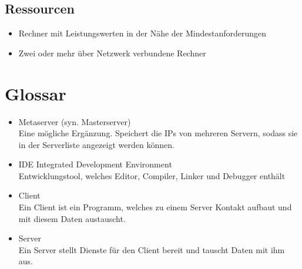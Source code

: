 \documentclass[a4paper,10pt]{article}
\begin{document}
\subsection{Ressourcen}
\begin{itemize}
\item Rechner mit Leistungswerten in der Nähe der Mindestanforderungen
\item Zwei oder mehr über Netzwerk verbundene Rechner
\end{itemize}
\section{Glossar}
\begin{itemize}
\item Metaserver (syn. Masterserver) \\
Eine mögliche Ergänzung. Speichert die IPs von mehreren Servern, sodass sie in der Serverliste angezeigt werden können.
\item IDE Integrated Development Environment \\
Entwicklungstool, welches Editor, Compiler, Linker und Debugger enthält
\item Client \\
Ein Client ist ein Programm, welches zu einem Server Kontakt aufbaut und mit diesem Daten austauscht.
\item Server \\
Ein Server stellt Dienste für den Client bereit und tauscht Daten mit ihm aus.
\end{itemize}
\end{document}
